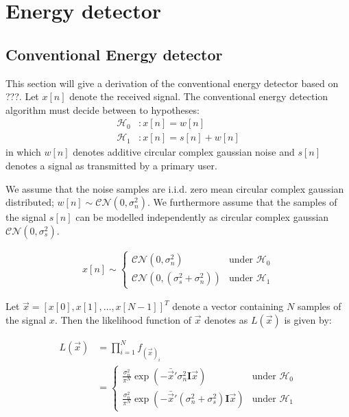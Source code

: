 \documentclass[a4paper, openany, oneside]{memoir}
\begin{document}
\section{Energy detector}

\subsection{Conventional Energy detector}\label{ssec:conv_ed_derivation}
This section will give a derivation of the conventional energy detector based on ???.
Let $x[n]$ denote the received signal. The conventional energy detection algorithm must decide between to hypotheses:
\begin{align}\label{eq:hypotheses}
  \mathcal{H}_0&: x[n] = w[n]\\
  \mathcal{H}_1&: x[n] = s[n] + w[n]
\end{align}
in which $w[n]$ denotes additive circular complex gaussian noise and $s[n]$ denotes a signal as transmitted by a primary user.

We assume that the noise samples are i.i.d. zero mean circular complex gaussian distributed; $w[n] \sim \mathcal{CN}(0, \sigma_n^2)$. 
We furthermore assume that the samples of the signal $s[n]$ can be modelled independently as circular complex gaussian $\mathcal{CN}(0, \sigma_s^2)$. %

\begin{align*}
x[n] \sim 
    \begin{cases}
        \mathcal{CN}(0, \sigma_n^2) & \text{under $\mathcal{H}_0$} \\
        \mathcal{CN}(0, (\sigma_s^2 + \sigma_n^2)) & \text{under $\mathcal{H}_1$}
    \end{cases}
\end{align*} 

Let $\vec{x} = \left[x[0], x[1], \ldots, x[N-1]\right]^T$ denote a vector containing $N$ samples of the signal $x$. Then the likelihood function of $\vec{x}$ denotes as $L(\vec{x})$ is given by:

\begin{align*}
    L(\vec{x}) &= \prod_{i=1}^N f_{(\vec{x})_i}\\
    &= \begin{cases}
        \frac{\sigma_n^2}{\pi^N } \exp(-\bar{\vec{x}}'\sigma_n^2\mathbf{I}\vec{x}) & \text{under $\mathcal{H}_0$} \\
        \frac{\sigma_n^2}{\pi^N } \exp(-\bar{\vec{x}}'(\sigma_n^2+\sigma_s^2)\mathbf{I}\vec{x}) & \text{under $\mathcal{H}_1$}
    \end{cases}
\end{align*}
\end{document}
